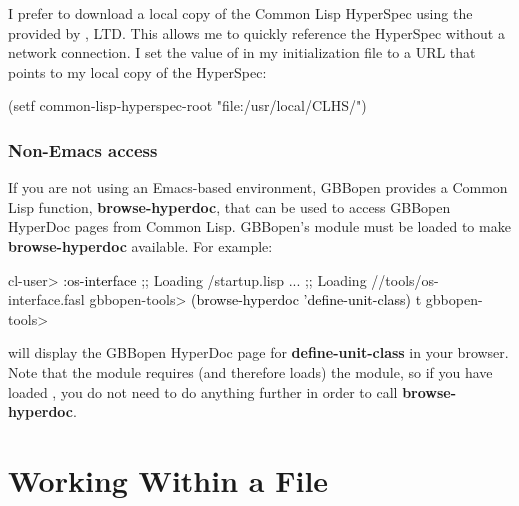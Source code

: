 \documentclass[10pt,twoside,english,pdftex]{article}
\begin{document}
I prefer to download a local copy of the Common Lisp HyperSpec using the
provided by , LTD.  This allows
me to quickly reference the HyperSpec without a network connection.  I set the
value of  in my  initialization
file to a URL that points to my local copy of the HyperSpec:
%
\W\supp
\begin{example}
  (setf common-lisp-hyperspec-root "file:/usr/local/CLHS/")
\end{example}

\subsubsection*{Non-Emacs access}

%
If you are not using an Emacs-based environment, GBBopen provides a Common
Lisp function, \textbf{browse-hyperdoc}, that can be used to access GBBopen
HyperDoc pages from Common Lisp.  GBBopen's  module must
be loaded to make \textbf{browse-hyperdoc} available.  For example:
%
\W\supp
\begin{example}
\textcolor{darkergray}{%
  cl-user> \textcolor{black}{:os-interface}
  ;; Loading /startup.lisp
     ...
  ;; Loading //tools/os-interface.fasl
  gbbopen-tools> \textcolor{black}{(browse-hyperdoc 'define-unit-class)}
  t
  gbbopen-tools>}
\end{example}
%
will display the GBBopen HyperDoc page for \textbf{define-unit-class} in your
browser.  Note that the  module requires (and therefore
loads) the  module, so if you have loaded
, you do not need to do anything further in order to call
\textbf{browse-hyperdoc}.


\T\markright{}%
\T\pagestyle{plain}
\T\cleardoublepage
\W{}
\T\pagestyle{fancy}
\T\thispagestyle{fancybottom}
\T\renewcommand{\headrulewidth}{0pt}
\section{Working Within a File}
\label{sec:file}%
\end{document}
